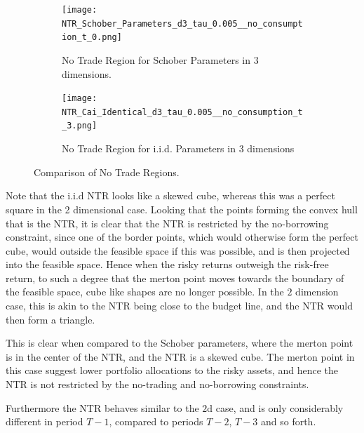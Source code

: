 \documentclass[11pt]{article}
\begin{document}
\begin{figure}[!ht]
    \centering
    \begin{subfigure}[t]{0.48\textwidth}
        \centering
        \texttt{[image: NTR\_Schober\_Parameters\_d3\_tau\_0.005\_\_no\_consumption\_t\_0.png]}
        \caption{No Trade Region for Schober Parameters in 3 dimensions.}
        \label{fig:NTR_3d_Schober}
    \end{subfigure}%
    \hfill
    \begin{subfigure}[t]{0.48\textwidth}
        \centering
        \texttt{[image: NTR\_Cai\_Identical\_d3\_tau\_0.005\_\_no\_consumption\_t\_3.png]}
        \caption{No Trade Region for i.i.d. Parameters in 3 dimensions}
        \label{fig:NTR_3d_iid_Correlation}
    \end{subfigure}

    \caption{Comparison of No Trade Regions.}
    \label{fig:comparison_NTR_3d}
\end{figure}
Note that the i.i.d NTR looks like a skewed cube, whereas this was a perfect square in the 2 dimensional case.
Looking that the points forming the convex hull that is the NTR, it is clear that the NTR is restricted by the no-borrowing constraint,
since one of the border points, which would otherwise form the perfect cube, would outside the feasible space if this was possible, and is then projected into the feasible space. 
Hence when the risky returns outweigh the risk-free return,
to such a degree that the merton point moves towards the boundary of the feasible space, cube like shapes are no longer possible.
In the $2$ dimension case, this is akin to the \ac{NTR} being close to the budget line, and the \ac{NTR} would then form a triangle.

This is clear when compared to the Schober parameters, where the merton point is in the center of the NTR, and the NTR is a skewed cube.
The merton point in this case suggest lower portfolio allocations to the risky assets, and hence the NTR is not restricted by the no-trading and no-borrowing constraints.

Furthermore the \ac{NTR} behaves similar to the $2$d case, and is only considerably different in period $T-1$,
compared to periods $T-2$, $T-3$ and so forth.
\end{document}
